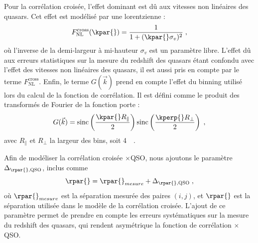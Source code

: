 Pour la corrélation croisée, l'effet dominant est dû aux vitesses non linéaires des quasars. Cet effet est modélisé par une lorentzienne :
\begin{equation}
  F_{\mathrm{NL}}^{\mathrm{cross}}(\kpar{}) = \frac{1}{1 + (\kpar{} \sigma_v)^2} \; ,
\end{equation}
où l'inverse de la demi-largeur à mi-hauteur $\sigma_v$ est un paramètre libre. L'effet dû aux erreurs statistiques sur la mesure du redshift des quasars étant confondu avec l'effet des vitesses non linéaires des quasars, il est aussi pris en compte par le terme $  F_{\mathrm{NL}}^{\mathrm{cross}}$.
Enfin, le terme $G(\vec k)$ prend en compte l'effet du binning utilisé lors du calcul de la fonction de corrélation.
Il est défini comme le produit des transformés de Fourier de la fonction porte :
\begin{equation}
  G(\vec k) = \mathrm{sinc}\left(\frac{\kpar{}R_{\parallel}}{2}\right)\mathrm{sinc}\left(\frac{\kperp{}R_{\perp}}{2}\right) \; ,
\end{equation}
avec $R_{\parallel}$ et $R_{\perp}$ la largeur des bins, soit \SI{4}{\perh\Mpc}.

Afin de modéliser la corrélation croisée \lya{}$\times$QSO, nous ajoutons le paramètre $\Delta_{\rpar{}, \textsc{QSO}}$, inclus comme
\begin{equation}
  \rpar{} = \rpar{}_{mesure} + \Delta_{\rpar{}, \textsc{QSO}} \; ,
\end{equation}
où $\rpar{}_{mesure}$ est la séparation mesurée des paires $(i,j)$, et $\rpar{}$ est la séparation utilisée dans le modèle de la corrélation croisée. L'ajout de ce paramètre permet de prendre en compte les erreurs systématiques sur la mesure du redshift des quasars, qui rendent asymétrique la fonction de corrélation \lya{}$\times$QSO.

